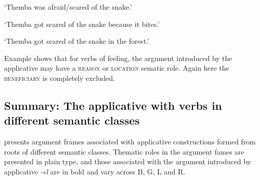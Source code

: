 \documentclass[output=paper]{langsci/langscibook}
\begin{document}
\glt ‘Themba was afraid/scared of the snake.’


\glt ‘Themba got scared of the snake because it bites.’


\glt ‘Themba got scared of the snake in the forest.’
\z
\z

Example  shows that for verbs of feeling, the argument introduced by the applicative may have a \textsc{reason} or \textsc{location} sematic role. Again here the \textsc{beneficiary} is completely excluded. 

\subsection{Summary: The applicative with verbs in different semantic classes}\label{sec:sibanda:4.7}

 presents argument frames associated with applicative constructions formed from roots of different semantic classes. Thematic roles in the argument fames are presented in plain type, and those associated with the argument introduced by applicative \textit{-el} are in bold and vary across B, G, L and R. 
\end{document}
